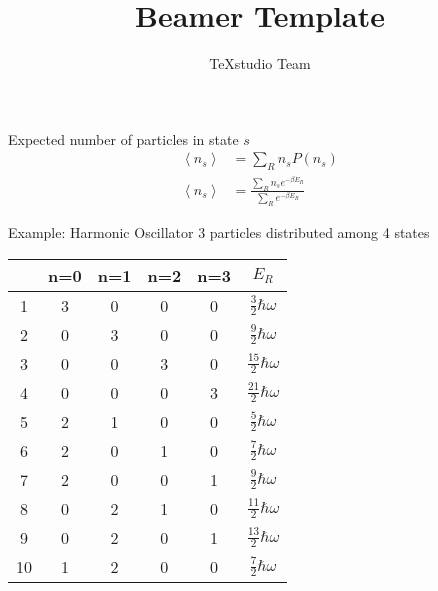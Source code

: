 \documentclass{beamer}
\title{Beamer Template}
\author{TeXstudio Team}
\begin{document}
\begin{frame}[plain]
    \maketitle
\end{frame}
\begin{frame}{Expected number of particles in state $s$}
	\begin{align*}
		\left<n_s\right>&=\sum_{R}n_sP(n_s)\\
		\left<n_s\right>&=\frac{\sum_{R}n_se^{-\beta E_R}}{\sum_{R}e^{-\beta E_R}}
	\end{align*}
\end{frame}



\begin{frame}{Example: Harmonic Oscillator}
	3 particles distributed among 4 states
	\renewcommand{\arraystretch}{1.5}
	\begin{tabular}{|c|c|c|c|c|c|}
		\hline
		&n=0&n=1&n=2&n=3&$E_R$\\
		\hline
		1&3&0&0&0&$\frac{3}{2}\hbar\omega$\\
		\hline
		2&0&3&0&0&$\frac{9}{2}\hbar\omega$\\
		\hline
		3&0&0&3&0&$\frac{15}{2}\hbar\omega$\\
		\hline
		4&0&0&0&3&$\frac{21}{2}\hbar\omega$\\
		\hline
		5&2&1&0&0&$\frac{5}{2}\hbar\omega$\\
		\hline
		6&2&0&1&0&$\frac{7}{2}\hbar\omega$\\
		\hline
		7&2&0&0&1&$\frac{9}{2}\hbar\omega$\\
		\hline
		8&0&2&1&0&$\frac{11}{2}\hbar\omega$\\
		\hline
		9&0&2&0&1&$\frac{13}{2}\hbar\omega$\\
		\hline
		10&1&2&0&0&$\frac{7}{2}\hbar\omega$\\
		\hline
	\end{tabular}
\end{frame}
\end{document}
